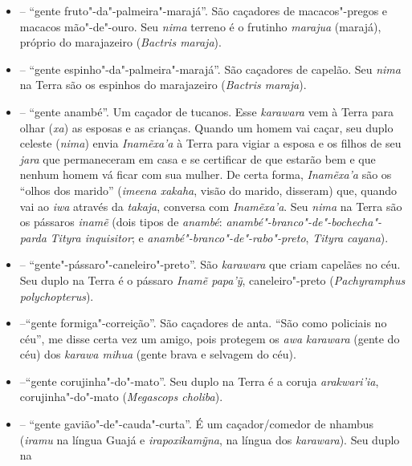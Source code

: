 \begin{itemize}
  dos brancos, \emph{karai janaha} (``canto dos brancos''). Seu duplo
  terreno é a ave \emph{pukua}, pomba"-trocal (\emph{Patagioenas
  speciosa}).
\item
  \emph{} -- ``gente fruto"-da"-palmeira"-marajá''. São
  caçadores de macacos"-pregos e macacos mão"-de"-ouro. Seu \emph{nima}
  terreno é o frutinho \emph{marajua} (marajá), próprio do marajazeiro
  (\emph{Bactris maraja}).
\item
  \emph{} -- ``gente espinho"-da"-palmeira"-marajá''. São
  caçadores de capelão. Seu \emph{nima} na Terra são os espinhos do
  marajazeiro (\emph{Bactris maraja}).
\item
  \emph{} -- ``gente anambé''. Um caçador de tucanos. Esse \emph{karawara}
  vem à Terra para olhar (\emph{xa}) as esposas e as crianças. Quando um
  homem vai caçar, seu duplo celeste (\emph{nima}) envia
  \emph{Inamẽxa'a} à Terra para vigiar a esposa e os filhos de
  seu \emph{jara} que permaneceram em casa e se certificar de que
  estarão bem e que nenhum homem vá ficar com sua mulher. De certa
  forma, \emph{Inamẽxa'a} são os ``olhos dos marido''
  (\emph{imeena xakaha}, visão do marido, disseram) que, quando vai ao
  \emph{iwa} através da \emph{takaja}, conversa com
  \emph{Inamẽxa'a}. Seu \emph{nima} na Terra são os pássaros
  \emph{inamẽ} (dois tipos de \emph{anambé}:
  \emph{anambé"-branco"-de"-bochecha"-parda} \emph{Tityra inquisitor}; e
  \emph{anambé"-branco"-de"-rabo"-preto}, \emph{Tityra} \emph{cayana}).
\item
  \emph{} -- ``gente"-pássaro"-caneleiro"-preto''. São
  \emph{karawara} que criam capelães no céu. Seu duplo na Terra é o
  pássaro \emph{Inamẽ papa'ỹ}, caneleiro"-preto (\emph{Pachyramphus
  polychopterus}).
\item
  \emph{} --``gente formiga"-correição''. São caçadores de
  anta. ``São como policiais no céu'', me disse certa vez um amigo, pois
  protegem os \emph{awa} \emph{karawara} (gente do céu) dos \emph{karawa
  mihua} (gente brava e selvagem do céu).
\item
   --``gente corujinha"-do"-mato''. Seu duplo
  na Terra é a coruja \emph{arakwari'ia}, corujinha"-do"-mato
  (\emph{Megascops choliba}).
\item
  \emph{} -- ``gente gavião"-de"-cauda"-curta''. É um
  caçador/comedor de nhambus (\emph{iramu} na língua Guajá e
  \emph{irapoxikamỹna}, na língua dos \emph{karawara}). Seu duplo na

\end{itemize}
